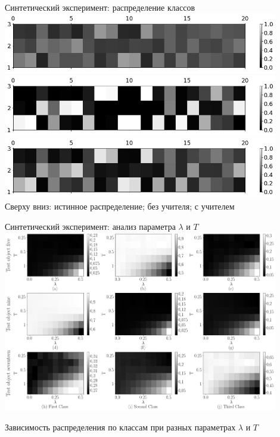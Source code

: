 \documentclass[9pt,pdf,hyperref={unicode}]{beamer}
\begin{document}
\begin{frame}{Синтетический эксперимент: распределение классов}
\justifying
{\center
\includegraphics[width=0.9\textwidth]{figures/syn_real_distr}\\
\includegraphics[width=0.9\textwidth]{figures/syn_without_teacher_distr}\\
\includegraphics[width=0.9\textwidth]{figures/syn_with_teacher_distr}\\
}
Сверху вниз: истинное распределение; без учителя; с учителем
\end{frame}

\begin{frame}{Синтетический эксперимент: анализ параметра $\lambda$ и $T$}
\justifying
{\center
\includegraphics[width=0.9\textwidth]{figures/syn_T_lambda}
}

Зависимость распределения по классам при разных параметрах $\lambda$ и $T$
\end{frame}
\end{document}
